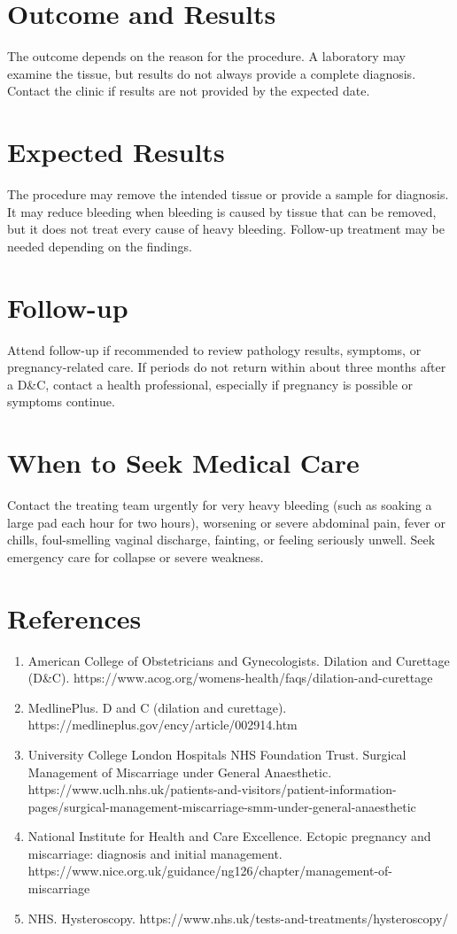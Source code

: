 \section*{Outcome and Results}
The outcome depends on the reason for the procedure. A laboratory may examine the tissue, but results do not always provide a complete diagnosis. Contact the clinic if results are not provided by the expected date.

\section*{Expected Results}
The procedure may remove the intended tissue or provide a sample for diagnosis. It may reduce bleeding when bleeding is caused by tissue that can be removed, but it does not treat every cause of heavy bleeding. Follow-up treatment may be needed depending on the findings.

\section*{Follow-up}
Attend follow-up if recommended to review pathology results, symptoms, or pregnancy-related care. If periods do not return within about three months after a D\&C, contact a health professional, especially if pregnancy is possible or symptoms continue.

\section*{When to Seek Medical Care}
Contact the treating team urgently for very heavy bleeding (such as soaking a large pad each hour for two hours), worsening or severe abdominal pain, fever or chills, foul-smelling vaginal discharge, fainting, or feeling seriously unwell. Seek emergency care for collapse or severe weakness.

\section*{References}
\begin{enumerate}
  \item American College of Obstetricians and Gynecologists. Dilation and Curettage (D\&C). https://www.acog.org/womens-health/faqs/dilation-and-curettage
  \item MedlinePlus. D and C (dilation and curettage). https://medlineplus.gov/ency/article/002914.htm
  \item University College London Hospitals NHS Foundation Trust. Surgical Management of Miscarriage under General Anaesthetic. https://www.uclh.nhs.uk/patients-and-visitors/patient-information-pages/surgical-management-miscarriage-smm-under-general-anaesthetic
  \item National Institute for Health and Care Excellence. Ectopic pregnancy and miscarriage: diagnosis and initial management. https://www.nice.org.uk/guidance/ng126/chapter/management-of-miscarriage
  \item NHS. Hysteroscopy. https://www.nhs.uk/tests-and-treatments/hysteroscopy/
\end{enumerate}

\clearpage
